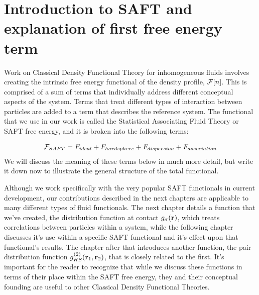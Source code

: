 \clearpage
\newpage



\section{Introduction to SAFT and explanation of first free energy term}


Work on Classical Density Functional Theory for inhomogeneous fluids
involves creating the intrinsic free energy functional of the density
profile, $\mathcal{F}[n]$.  This is comprised of a sum of terms that
individually address different conceptual aspects of the system.
Terms that treat different types of interaction between particles are
added to a term that describes the reference system.  The functional
that we use in our work is called the Statistical Associating Fluid
Theory or SAFT free energy, and it is broken into the following terms:

\begin{align}
  \mathcal{F}_{SAFT} = F_{ideal} + F_{hard sphere} + F_{dispersion} + F_{association}
\end{align}
We will discuss the meaning of these terms below in much more detail,
but write it down now to illustrate the general structure of the total
functional.


Although we work specifically with the very popular SAFT functionals
in current development, our contributions described in the next
chapters are applicable to many different types of fluid functionals.
The next chapter details a function that we've created, the
distribution function at contact $g_\sigma(\textbf{r})$, which treats
correlations between particles within a system, while the following
chapter discusses it's use within a specific SAFT functional and it's
effect upon that functional's results.  The chapter after that
introduces another function, the pair distribution function
$g^{(2)}_{HS}(\textbf{r}_1,\textbf{r}_2)$, that is closely related to the first.
It's important for the reader to recognize that while we discuss these
functions in terms of their place within the SAFT free energy, they
and their conceptual founding are useful to other Classical Density
Functional Theories.




